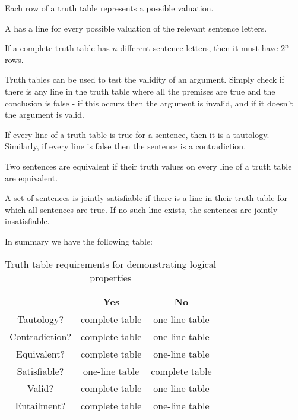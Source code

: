 \documentclass[12pt, a4paper, twoside, openright, titlepage]{book}
\begin{document}
\begin{rmk}{}{}
    Each row of a truth table represents a possible valuation.
\end{rmk}

\begin{defn}{}{}
    A  has a line for every possible valuation of the relevant sentence letters.
\end{defn}


\begin{prop}{}{}
    If a complete truth table has $n$ different sentence letters, then it must have $2^n$ rows.
\end{prop}


\begin{rmk}{}{}
    Truth tables can be used to test the validity of an argument. Simply check if there is any line in the truth table where all the premises are true and the conclusion is false - if this occurs then the argument is invalid, and if it doesn't the argument is valid.
\end{rmk}

\begin{rmk}{}{}
    If every line of a truth table is true for a sentence, then it is a tautology. Similarly, if every line is false then the sentence is a contradiction.
\end{rmk}

\begin{rmk}{}{}
    Two sentences are equivalent if their truth values on every line of a truth table are equivalent.
\end{rmk}


\begin{rmk}{}{}
    A set of sentences is jointly satisfiable if there is a line in their truth table for which all sentences are true. If no such line exists, the sentences are jointly insatisfiable.
\end{rmk}

In summary we have the following table:

\begin{table}[H]
    \centering
    \caption{Truth table requirements for demonstrating logical properties}
    \begin{tabular}{c|cc}
        & \textbf{Yes} & \textbf{No} \\ \hline
        Tautology? & complete table & one-line table \\
        Contradiction? & complete table & one-line table \\
        Equivalent? & complete table & one-line table \\
        Satisfiable? & one-line table & complete table \\
        Valid? & complete table & one-line table \\
        Entailment? & complete table & one-line table
    \end{tabular}
\end{table}
\end{document}
